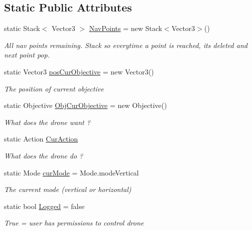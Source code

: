 \subsection*{Static Public Attributes}
\begin{DoxyCompactItemize}
\item 
static Stack$<$ Vector3 $>$ \hyperlink{class_drone_1_1_program_ad40ef1f4efb2b65d600ab10634066735}{Nav\+Points} = new Stack$<$Vector3$>$()
\begin{DoxyCompactList}\small\item\em All nav points remaining. Stack so everytime a point is reached, it\textquotesingle{}s deleted and next point pop. \end{DoxyCompactList}\item 
static Vector3 \hyperlink{class_drone_1_1_program_a14665ed89a4807be1919bf2cb7d1e943}{pos\+Cur\+Objective} = new Vector3()
\begin{DoxyCompactList}\small\item\em The position of current objective \end{DoxyCompactList}\item 
static Objective \hyperlink{class_drone_1_1_program_aff66fb52ebe59fd675ca624f522d7cf1}{Obj\+Cur\+Objective} = new Objective()
\begin{DoxyCompactList}\small\item\em What does the drone want ? \end{DoxyCompactList}\item 
static Action \hyperlink{class_drone_1_1_program_ad99d975310d2e7ec9ee9a7dc1b4f5877}{Cur\+Action}
\begin{DoxyCompactList}\small\item\em What does the drone do ? \end{DoxyCompactList}\item 
static Mode \hyperlink{class_drone_1_1_program_a68f4c050d6a63cb7b73b321a0c4d6939}{cur\+Mode} = Mode.\+mode\+Vertical
\begin{DoxyCompactList}\small\item\em The current mode (vertical or horizontal) \end{DoxyCompactList}\item 
static bool \hyperlink{class_drone_1_1_program_a0456c7157246ae73aed90f2f3b975cb6}{Logged} = false
\begin{DoxyCompactList}\small\item\em True = user has permissions to control drone \end{DoxyCompactList}\item 

\end{DoxyCompactItemize}
